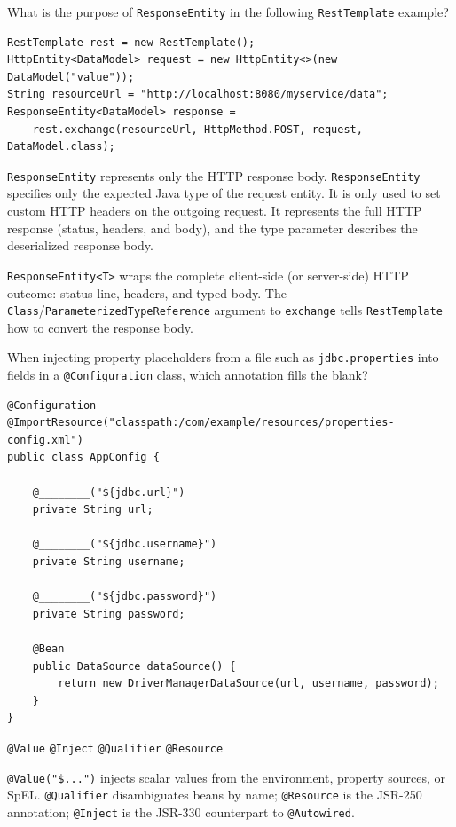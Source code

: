 
\question[4]
What is the purpose of \texttt{ResponseEntity} in the following \texttt{RestTemplate} example?
\begin{lstlisting}[style=java]
RestTemplate rest = new RestTemplate();
HttpEntity<DataModel> request = new HttpEntity<>(new DataModel("value"));
String resourceUrl = "http://localhost:8080/myservice/data";
ResponseEntity<DataModel> response =
    rest.exchange(resourceUrl, HttpMethod.POST, request, DataModel.class);
\end{lstlisting}
\begin{choices}
  \choice \texttt{ResponseEntity} represents only the HTTP response body.
  \choice \texttt{ResponseEntity} specifies only the expected Java type of the request entity.
  \choice It is only used to set custom HTTP headers on the outgoing request.
  \CorrectChoice It represents the full HTTP response (status, headers, and body), and the type parameter describes the deserialized response body.
\end{choices}
\begin{solution}
  \texttt{ResponseEntity<T>} wraps the complete client-side (or server-side) HTTP outcome: status line, headers, and typed body. The \texttt{Class}/\texttt{ParameterizedTypeReference} argument to \texttt{exchange} tells \texttt{RestTemplate} how to convert the response body.
\end{solution}

\question[4]
When injecting property placeholders from a file such as \texttt{jdbc.properties} into fields in a \texttt{@Configuration} class, which annotation fills the blank?
\begin{lstlisting}[style=java]
@Configuration
@ImportResource("classpath:/com/example/resources/properties-config.xml")
public class AppConfig {

    @________("${jdbc.url}")
    private String url;

    @________("${jdbc.username}")
    private String username;

    @________("${jdbc.password}")
    private String password;

    @Bean
    public DataSource dataSource() {
        return new DriverManagerDataSource(url, username, password);
    }
}
\end{lstlisting}
\begin{choices}
  \CorrectChoice \texttt{@Value}
  \choice \texttt{@Inject}
  \choice \texttt{@Qualifier}
  \choice \texttt{@Resource}
\end{choices}
\begin{solution}
  \texttt{@Value("\${...}")} injects scalar values from the environment, property sources, or SpEL. \texttt{@Qualifier} disambiguates beans by name; \texttt{@Resource} is the JSR-250 annotation; \texttt{@Inject} is the JSR-330 counterpart to \texttt{@Autowired}.
\end{solution}

